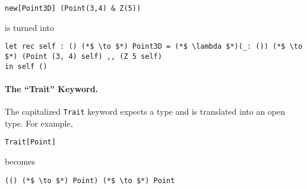 \begin{lstlisting}
new[Point3D] (Point(3,4) & Z(5))
\end{lstlisting}

\noindent is turned into

\begin{lstlisting}
let rec self : () (*$ \to $*) Point3D = (*$ \lambda $*)(_: ()) (*$ \to $*) (Point (3, 4) self) ,, (Z 5 self)
in self ()
\end{lstlisting}

\paragraph{The ``Trait'' Keyword.} The capitalized \lstinline$Trait$ keyword
expects a type and is translated into an open type. For example,

\begin{lstlisting}
Trait[Point]
\end{lstlisting}

\noindent becomes

\begin{lstlisting}
(() (*$ \to $*) Point) (*$ \to $*) Point
\end{lstlisting}

